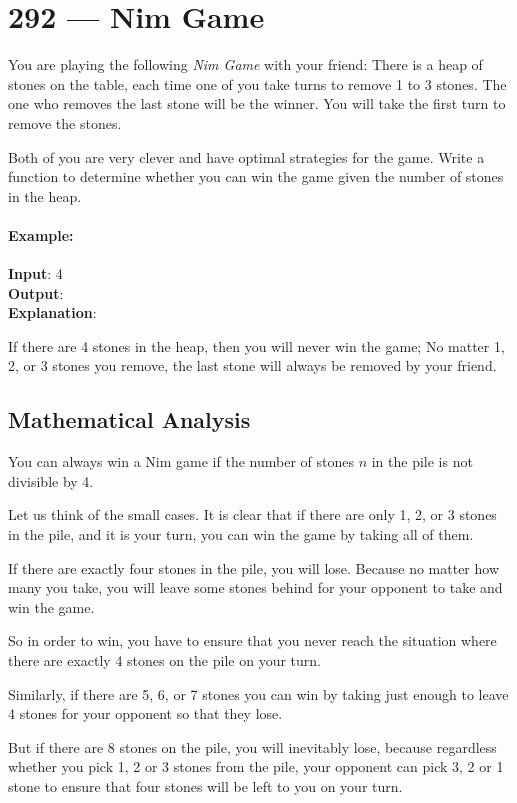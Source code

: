 \section{292 --- Nim Game}
You are playing the following \textit{Nim Game} with your friend: There is a heap of stones on the table, each time one of you take turns to remove 1 to 3 stones. The one who removes the last stone will be the winner. You will take the first turn to remove the stones.

Both of you are very clever and have optimal strategies for the game. Write a function to determine whether you can win the game given the number of stones in the heap.

\paragraph{Example:}

\begin{flushleft}
\textbf{Input}: 4
\\
\textbf{Output}:  
\\
\textbf{Explanation}: 

If there are 4 stones in the heap, then you will never win the game; No matter 1, 2, or 3 stones you remove, the last stone will always be removed by your friend.
\end{flushleft}
\subsection{Mathematical Analysis}
You can always win a Nim game if the number of stones $n$ in the pile is not divisible by 4.

Let us think of the small cases. It is clear that if there are only 1, 2, or 3 stones in the pile, and it is your turn, you can win the game by taking all of them. 

If there are exactly four stones in the pile, you will lose. Because no matter how many you take, you will leave some stones behind for your opponent to take and win the game.

So in order to win, you have to ensure that you never reach the situation where there are exactly 4 stones on the pile on your turn.

Similarly, if there are 5, 6, or 7 stones you can win by taking just enough to leave 4 stones for your opponent so that they lose. 

But if there are 8 stones on the pile, you will inevitably lose, because regardless whether you pick 1, 2 or 3 stones from the pile, your opponent can pick 3, 2 or 1 stone to ensure that four stones will be left to you on your turn.

